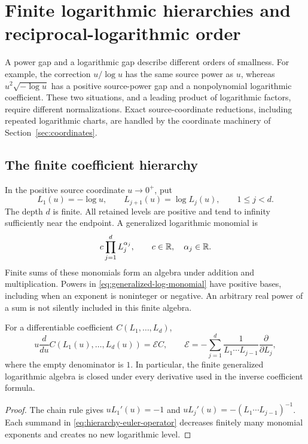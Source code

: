 \section{Finite logarithmic hierarchies and reciprocal-logarithmic order}
\label{sec:logarithmic-scales}

A power gap and a logarithmic gap describe different orders of smallness.
For example, the correction $u/\log u$ has the same source power as $u$,
whereas $u^2\sqrt{-\log u}$ has a positive source-power gap and a
nonpolynomial logarithmic coefficient. These two situations, and a
leading product of logarithmic factors, require different normalizations. Exact
source-coordinate reductions, including repeated logarithmic charts, are
handled by the coordinate machinery of Section~\ref{sec:coordinates}.

\subsection{The finite coefficient hierarchy}

In the positive source coordinate $u\to0^+$, put
\begin{equation}
 L_1(u)=-\log u,\qquad L_{j+1}(u)=\log L_j(u),
 \qquad 1\le j<d.
 \label{eq:logarithmic-hierarchy}
\end{equation}
The depth $d$ is finite. All retained levels are positive and tend to
infinity sufficiently near the endpoint. A generalized logarithmic
monomial is
\begin{equation}
 c\prod_{j=1}^d L_j^{\alpha_j},\qquad
 c\in\mathbb R,\quad \alpha_j\in\mathbb R.
 \label{eq:generalized-log-monomial}
\end{equation}
Finite sums of these monomials form an algebra under addition and
multiplication. Powers in \eqref{eq:generalized-log-monomial} have positive
bases, including when an exponent is noninteger or negative. An arbitrary
real power of a sum is not silently included in this finite algebra.

\begin{proposition}
\label{prop:logarithmic-euler-closure}
For a differentiable coefficient $C(L_1,\ldots,L_d)$,
\begin{equation}
 u\frac{d}{du}C(L_1(u),\ldots,L_d(u))
 =\mathcal E C,
 \qquad
 \mathcal E=-\sum_{j=1}^d
 \frac{1}{L_1\cdots L_{j-1}}\frac{\partial}{\partial L_j},
 \label{eq:hierarchy-euler-operator}
\end{equation}
where the empty denominator is $1$. In particular, the finite generalized
logarithmic algebra is closed under every derivative used in the inverse
coefficient formula.
\end{proposition}
\begin{proof}
The chain rule gives $uL_1'(u)=-1$ and
$uL_j'(u)=-(L_1\cdots L_{j-1})^{-1}$. Each summand in
\eqref{eq:hierarchy-euler-operator} decreases finitely many monomial
exponents and creates no new logarithmic level.
\end{proof}

